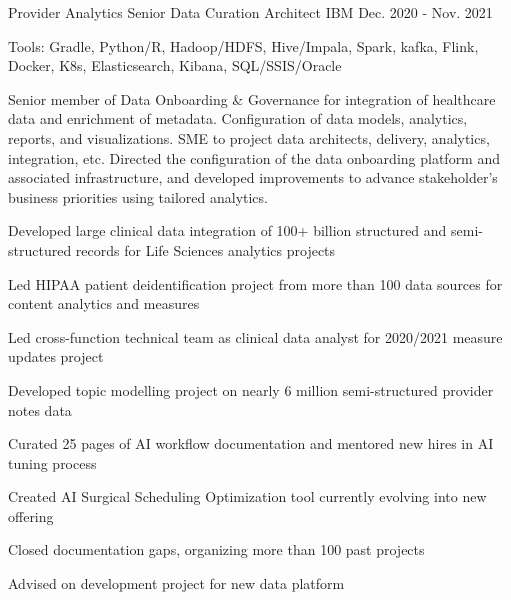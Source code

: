 \begin{cventries}
  \cvexpentry
    {Provider Analytics} %
    {Senior Data Curation Architect} %
    {IBM}
    {Dec. 2020 - Nov. 2021}
    {
      \begin{cvheavyparagraph}
        Tools: Gradle, Python/R, Hadoop/HDFS, Hive/Impala, Spark, kafka, Flink, Docker, K8s, Elasticsearch, Kibana, SQL/SSIS/Oracle
      \end{cvheavyparagraph}
    }
    {
      \begin{cvparagraph}
        Senior member of Data Onboarding \& Governance for integration of healthcare data and enrichment of metadata. Configuration of data models, analytics, reports, and visualizations. SME to project data architects, delivery, analytics, integration, etc. Directed the configuration of the data onboarding platform and associated infrastructure, and developed improvements to advance stakeholder’s business priorities using tailored analytics.
      \end{cvparagraph}
      \begin{cvitems} %
        \item {Developed large clinical data integration of 100+ billion structured and semi-structured records for Life Sciences analytics projects}
        \item {Led HIPAA patient deidentification project from more than 100 data sources for content analytics and measures}
        \item {Led cross-function technical team as clinical data analyst for 2020/2021 measure updates project}
        \item {Developed topic modelling project on nearly 6 million semi-structured provider notes data}
        \item {Curated 25 pages of AI workflow documentation and mentored new hires in AI tuning process}
        \item {Created AI Surgical Scheduling Optimization tool currently evolving into new offering}
        \item {Closed documentation gaps, organizing more than 100 past projects}
        \item {Advised on development project for new data platform}
      \end{cvitems}
    }


\end{cventries}
